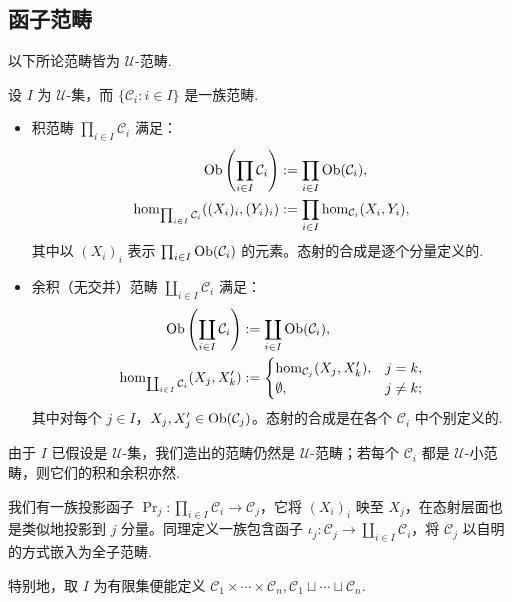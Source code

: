 \subsection{函子范畴}\label{sec:functor-category}

以下所论范畴皆为 $\mathcal{U}$-范畴.

\begin{definition}
	设 $I$ 为 $\mathcal{U}$-集，而 $\{\mathcal{C}_i : i \in I \}$ 是一族范畴.
	\begin{itemize}
		\item 积范畴 $\prod_{i \in I} \mathcal{C}_i$ 满足：
			\begin{align*}
				\operatorname{Ob}\left( \prod_{i \in I} \mathcal{C}_i \right) & := \prod_{i \in I} \operatorname{Ob}(\mathcal{C}_i), \\
				\hom_{\prod_{i \in I} \mathcal{C}_i}( (X_i)_i, (Y_i)_i ) & := \prod_{i \in I} \hom_{\mathcal{C}_i}(X_i, Y_i),
			\end{align*}
			其中以 $(X_i)_i$ 表示 $\prod_{i \in I} \operatorname{Ob}(\mathcal{C}_i)$ 的元素。态射的合成是逐个分量定义的.
		\item 余积（无交并）范畴 $\coprod_{i \in I} \mathcal{C}_i$ 满足：
			\begin{align*}
				\operatorname{Ob}\left( \coprod_{i \in I} \mathcal{C}_i \right) & := \coprod_{i \in I} \operatorname{Ob}(\mathcal{C}_i), \\
				\hom_{\coprod_{i \in I} \mathcal{C}_i}(X_j, X'_k) & :=
				\begin{cases}
					\hom_{\mathcal{C}_j}(X_j, X'_k), & j = k, \\
					\emptyset, & j \neq k;
				\end{cases}
			\end{align*}
			其中对每个 $j \in I$，$X_j, X'_j \in \operatorname{Ob}(\mathcal{C}_j)$。态射的合成是在各个 $\mathcal{C}_i$ 中个别定义的.
	\end{itemize}
\end{definition}
由于 $I$ 已假设是 $\mathcal{U}$-集，我们造出的范畴仍然是 $\mathcal{U}$-范畴；若每个 $\mathcal{C}_i$ 都是 $\mathcal{U}$-小范畴，则它们的积和余积亦然.

我们有一族投影函子 $\Pr_j: \prod_{i \in I} \mathcal{C}_i \to \mathcal{C}_j$，它将 $(X_i)_i$ 映至 $X_j$，在态射层面也是类似地投影到 $j$ 分量。同理定义一族包含函子 $\iota_j: \mathcal{C}_j \to \coprod_{i \in I} \mathcal{C}_i$，将 $\mathcal{C}_j$ 以自明的方式嵌入为全子范畴.

特别地，取 $I$ 为有限集便能定义 $\mathcal{C}_1 \times \cdots \times \mathcal{C}_n, \mathcal{C}_1 \sqcup \cdots \sqcup \mathcal{C}_n$.

